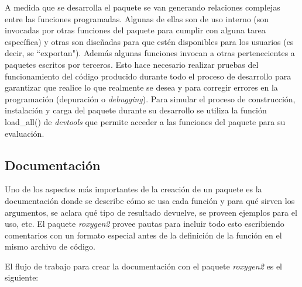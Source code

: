 A medida que se desarrolla el paquete se van generando relaciones complejas entre las funciones programadas. Algunas de ellas son de uso interno (son invocadas por otras funciones del paquete para cumplir con alguna tarea específica) y otras son diseñadas para que estén disponibles para los usuarios (es decir, se ``exportan"). Además algunas funciones invocan a otras pertenecientes a paquetes escritos por terceros. Esto hace necesario realizar pruebas del funcionamiento del código  producido durante todo el proceso de desarrollo para garantizar que realice lo que realmente se desea y para corregir errores en la programación (depuración o \emph{debugging}). Para simular el proceso de construcción, instalación y carga del paquete durante su desarrollo se utiliza la función 
\textcolor{fandango}{load\_all()} de \emph{devtools} que permite acceder a las funciones del paquete para su evaluación.


\subsection{Documentación}

Uno de los aspectos más importantes de la creación de un paquete es la documentación donde se describe cómo se usa cada función y para qué sirven los argumentos, se aclara qué tipo de resultado devuelve, se proveen ejemplos para el uso, etc. El paquete \emph{roxygen2} provee pautas para incluir todo esto escribiendo comentarios con un formato especial antes de la definición de la función en el mismo archivo de código. 

El flujo de trabajo para crear la documentación con el paquete \emph{roxygen2} es el siguiente:

